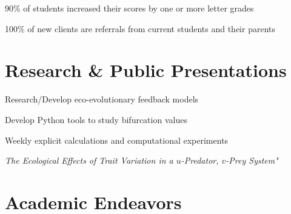 \documentclass[letterpaper]{deedy-resume} %
\begin{document}
\begin{minipage}[t]{0.66\textwidth}


\begin{tightitemize}
\item 90\% of students increased their scores by one or more letter grades
\item 100\% of new clients are referrals from current students and their parents
\end{tightitemize}

\sectionspace %


\section{Research \& Public Presentations}


\begin{tightitemize}
\item Research/Develop eco-evolutionary feedback models
\item Develop Python tools to study bifurcation values
\item Weekly explicit calculations and computational experiments
\end{tightitemize}
\sectionspace %



{\it The Ecological Effects of Trait Variation in a $u$-Predator, $v$-Prey System"}

\sectionspace %


\section{Academic Endeavors}

\end{minipage}
\end{document}
